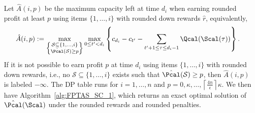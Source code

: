 Let $\hat{A}(i,p)$ be the maximum capacity left at time $d_i$ when earning rounded profit at least $p$ using items $\{1,\ldots,i\}$ with rounded down rewards $\hat{r}$, equivalently,
\begin{align}\label{Ahat2}
\hat{A}(i,p) := \max_{\left\{\substack{\mathcal{S}\subseteq\{1,\ldots,i\}\\
		\hat{\Pcal}(\mathcal{S})\ge p}\right\}} \max_{0 \leq t' < d_i}\left\{ c_{d_i} - c_{t'} - \sum_{t'+1 \leq \tau \leq  d_i-1} \Qcal(\Scal(\tau)) \right\}.
\end{align}
If it is not possible to earn profit $p$ at time $d_i$ using items $\{1,\ldots,i\}$ with rounded down rewards, i.e., no $\mathcal{S}\subseteq\{1,\ldots,i\}$ exists such that $\hat{\Pcal}(\mathcal{S})\ge p$, then $\hat{A}(i,p)$ is labeled $-\infty$. The DP table runs for $i=1,\ldots,n$ and $p=0,\kappa, \ldots,\left\lceil\frac{4n}{\epsilon}\right\rceil\kappa$.
We then have Algorithm~\ref{alg:FPTAS_SC_1}, which returns an exact optimal solution of $\hat{\Pcal}(\Scal)$ under the rounded rewards and rounded penalties.
